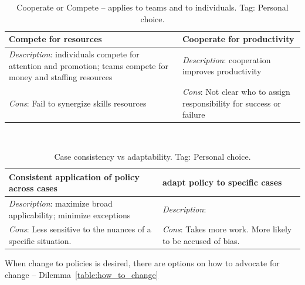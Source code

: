 \begin{center}
\begin{table}[ht]
\begin{tabular}{ | m{\dilemmatablewidth}| m{\dilemmatablewidth} | } 
  \hline
  \textbf{Compete for resources} &
  \textbf{Cooperate for productivity} \\
  \hline
  \textit{Description}: individuals compete for attention and promotion; teams compete for money and staffing resources &
  \textit{Description}: cooperation improves productivity \\  
  \hline
  \textit{Cons}: Fail to synergize skills resources & 
  \textit{Cons}: Not clear who to assign responsibility for success or failure \\
  \hline
\end{tabular}
\caption{Cooperate or Compete -- applies to teams and to individuals. 
{\tiny Tag: Personal choice.}
}
\label{table:cooperate-vs-compete}
\end{table}
\end{center}

\ \\

\begin{center}
\begin{table}[ht]
\begin{tabular}{ | m{\dilemmatablewidth}| m{\dilemmatablewidth} | }
  \hline
  \textbf{Consistent application of policy across cases} &
  \textbf{adapt policy to specific cases} \\
  \hline
  \textit{Description}: maximize broad applicability; minimize exceptions &
  \textit{Description}:  \\  
  \hline
  \textit{Cons}: Less sensitive to the nuances of a specific situation. & 
  \textit{Cons}: Takes more work. More likely to be accused of bias. \\
  \hline
\end{tabular}
\caption{Case consistency vs adaptability.
{\tiny Tag: Personal choice.}
}
\label{table:policy_consistency_across_cases}
\end{table}
\end{center}

When change to policies is desired, there are options on how to advocate for change -- Dilemma~\ref{table:how_to_change} 

